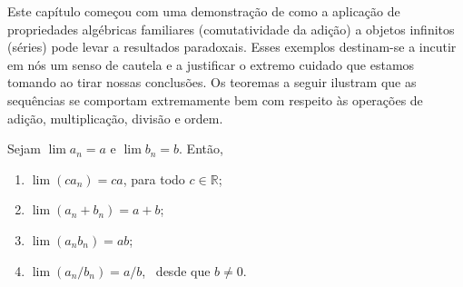Este capítulo começou com uma demonstração de como a aplicação de propriedades algébricas familiares (comutatividade da adição) a objetos infinitos (séries) pode levar a resultados paradoxais. Esses exemplos destinam-se a incutir em nós um senso de cautela e a justificar o extremo cuidado que estamos tomando ao tirar nossas conclusões. Os teoremas a seguir ilustram que as sequências se comportam extremamente bem com respeito às operações de adição, multiplicação, divisão e ordem. 

\begin{theorem}\label{thm:limite-algebrico}
Sejam $\lim a_n = a$ e $\lim b_n = b$. Então,
\begin{enumerate}[label=(\roman*)]
\item $\lim (ca_n) = ca$, \quad para todo $c \in \mathbb{R}$;
\item $\lim (a_n + b_n) = a + b$;
\item $\lim (a_n b_n) = ab$;
\item $\lim (a_n / b_n) = a / b$, \ desde que $b \neq 0$.
\end{enumerate}
\end{theorem}

